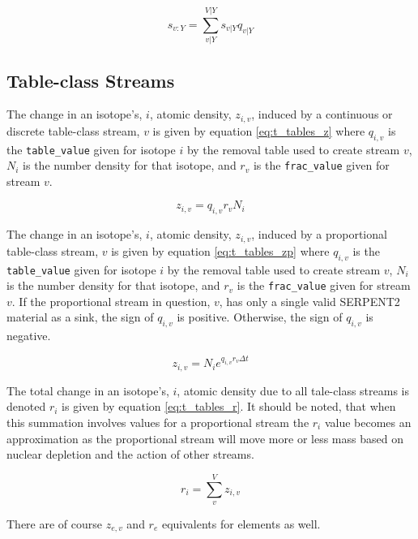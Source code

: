 \begin{equation}\label{eq:t_streams_sum}
s_{v:Y} = \sum_{v|Y}^{V|Y} s_{v|Y}q_{v|Y}
\end{equation}

\subsection{Table-class Streams}\label{sssec:t_tables}
The change in an isotope's, $i$, atomic density, $z_{i,v}$, induced by a 
continuous or discrete table-class stream, $v$ is given by equation 
\ref{eq:t_tables_z} where $q_{i,v}$ is the \texttt{table\_value} given for 
isotope $i$ by the removal table used to create stream $v$, $N_{i}$ is the 
number density for that isotope, and $r_{v}$ is the \texttt{frac\_value} given 
for stream $v$.

\begin{equation}\label{eq:t_tables_z}
z_{i,v} = q_{i,v} r_{v} N_{i}
\end{equation}

The change in an isotope's, $i$, atomic density, $z_{i,v}$, induced by a 
proportional table-class stream, $v$ is given by equation 
\ref{eq:t_tables_zp} where $q_{i,v}$ is the \texttt{table\_value} given for 
isotope $i$ by the removal table used to create stream $v$, $N_{i}$ is the 
number density for that isotope, and $r_{v}$ is the \texttt{frac\_value} given 
for stream $v$. If the proportional stream in question, $v$, has only a single
valid SERPENT2 material as a sink, the sign of $q_{i,v}$ is positive. Otherwise,
the sign of $q_{i,v}$ is negative. 

\begin{equation}\label{eq:t_tables_zp}
z_{i,v} = N_{i}e^{q_{i,v} r_{v} \Delta t}
\end{equation}

The total change in an isotope's, $i$, atomic density due to all 
tale-class streams is denoted $r_{i}$ is given by equation
\ref{eq:t_tables_r}. It should be noted, that when this summation involves
values for a proportional stream the $r_{i}$ value becomes an approximation
as the proportional stream will move more or less mass based on nuclear
depletion and the action of other streams.

\begin{equation}\label{eq:t_tables_r}
r_{i} = \sum_{v}^{V} z_{i,v}
\end{equation}

There are of course $z_{e,v}$ and $r_{e}$ equivalents for elements as well.

